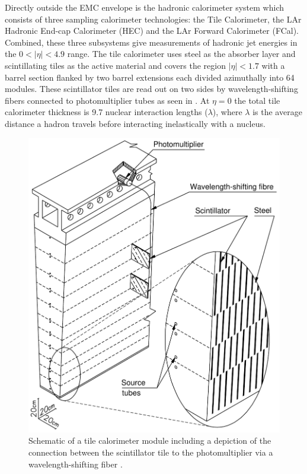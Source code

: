 Directly outside the EMC envelope is the hadronic calorimeter system
\cite{PERF-2007-01} which consists of three sampling calorimeter technologies:
the Tile Calorimeter, the LAr Hadronic End-cap Calorimeter (HEC) and the LAr
Forward Calorimeter (FCal).  Combined, these three subsystems give measurements
of hadronic jet energies in the $0 <|\eta| < 4.9$ range. The tile calorimeter
uses steel as the absorber layer and scintillating tiles as the active material
and covers the region $|\eta| < 1.7$ with a barrel section flanked by two barrel
extensions each divided azimuthally into 64 modules.  These scintillator tiles
are read out on two sides by wavelength-shifting fibers connected to
photomultiplier tubes as seen in . At $\eta =
0$ the total tile calorimeter thickness is 9.7 nuclear interaction lengths
($\lambda$), where $\lambda$ is the average distance a hadron travels before
interacting inelastically with a nucleus.
\begin{figure}[!htbp]
  \begin{center}
    \includegraphics[width=0.8\linewidth]{figures/atlas/tile_calorimeter.pdf}
    \caption{Schematic of a tile calorimeter module
including a depiction of the connection between the scintillator tile to the
photomultiplier via a wavelength-shifting fiber \cite{PERF-2007-01}.}
    \label{fig:tile_calorimeter}
  \end{center}
\end{figure}

